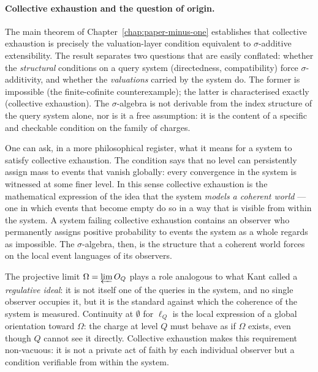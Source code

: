\paragraph{Collective exhaustion and the question of origin.}
The main theorem of Chapter~\ref{chap:paper-minus-one} establishes that collective
exhaustion is precisely the valuation-layer condition equivalent to $\sigma$-additive
extensibility.  The result separates two questions that are easily conflated: whether
the \emph{structural} conditions on a query system (directedness, compatibility) force
$\sigma$-additivity, and whether the \emph{valuations} carried by the system do.  The
former is impossible (the finite-cofinite counterexample); the latter is characterised
exactly (collective exhaustion).  The $\sigma$-algebra is not derivable from the index
structure of the query system alone, nor is it a free assumption: it is the content of
a specific and checkable condition on the family of charges.

One can ask, in a more philosophical register, what it means for a system to satisfy
collective exhaustion.  The condition says that no level can persistently assign mass
to events that vanish globally: every convergence in the system is witnessed at some
finer level.  In this sense collective exhaustion is the mathematical expression of
the idea that the system \emph{models a coherent world} --- one in which events that
become empty do so in a way that is visible from within the system.  A system failing
collective exhaustion contains an observer who permanently assigns positive probability
to events the system as a whole regards as impossible.  The $\sigma$-algebra, then, is
the structure that a coherent world forces on the local event languages of its
observers.

The projective limit $\Omega = \varprojlim O_Q$ plays a role analogous to what Kant
called a \emph{regulative ideal}: it is not itself one of the queries in the system,
and no single observer occupies it, but it is the standard against which the
coherence of the system is measured.  Continuity at $\emptyset$ for $\ell_Q$ is the
local expression of a global orientation toward $\Omega$: the charge at level $Q$
must behave as if $\Omega$ exists, even though $Q$ cannot see it directly.  Collective
exhaustion makes this requirement non-vacuous: it is not a private act of faith by
each individual observer but a condition verifiable from within the system.

\medskip

